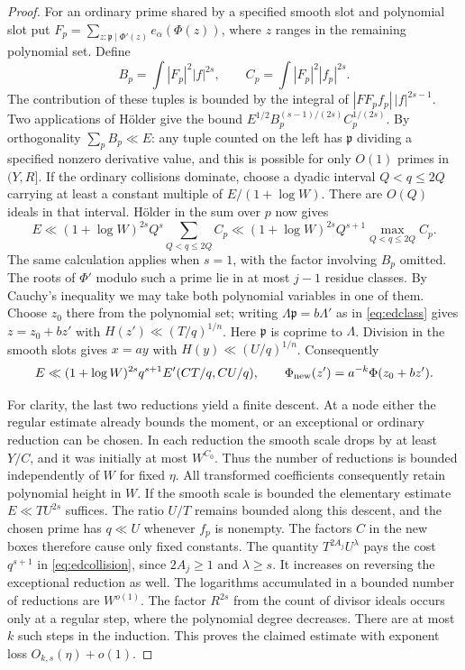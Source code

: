 \documentclass[11pt,letterpaper]{article}
\theoremstyle{definition}
\numberwithin{equation}{section}
\begin{document}
\begin{proof}
For an ordinary prime shared by a specified smooth slot and polynomial
slot put $F_p=\sum_{z:\mathfrak p\mid\Phi'(z)} e_\alpha(\Phi(z))$,
where $z$ ranges in the remaining polynomial set. Define
\[
 B_p=\int |F_p|^2|f|^{2s},\qquad
 C_p=\int |F_p|^2|f_p|^{2s}.
\]
The contribution of these tuples is bounded by the integral of
$|F F_p f_p|\,|f|^{2s-1}$. Two applications of H\"older give the bound
$E^{1/2}B_p^{(s-1)/(2s)}C_p^{1/(2s)}$. By orthogonality
$\sum_p B_p\ll E$: any tuple counted on the left has $\mathfrak p$
dividing a specified nonzero derivative value, and this is possible for
only $O(1)$ primes in $(Y,R]$. If the ordinary collisions dominate,
choose a dyadic interval $Q<q\le2Q$ carrying at least a constant
multiple of $E/(1+\log W)$. There are $O(Q)$ ideals in that interval.
H\"older in the sum over $p$ now gives
\[
 E\ll (1+\log W)^{2s} Q^{s}\sum_{Q<q\le2Q} C_p
 \ll (1+\log W)^{2s} Q^{s+1}\max_{Q<q\le2Q} C_p .
\]
The same calculation applies when $s=1$, with the factor involving
$B_p$ omitted. The roots of $\Phi'$ modulo such a prime lie in at most
$j-1$ residue classes. By Cauchy's inequality we may take both
polynomial variables in one of them. Choose $z_0$ there from the
polynomial set; writing $\Lambda\mathfrak p=b\Lambda'$ as in
\eqref{eq:edclass} gives $z=z_0+bz'$ with
$H(z')\ll (T/q)^{1/n}$. Here $\mathfrak p$ is coprime to $\Lambda$.
Division in the smooth slots gives $x=ay$ with $H(y)\ll (U/q)^{1/n}$.
Consequently
\begin{equation}\label{eq:edcollision}
 E\ll (1+\log W)^{2s}q^{s+1} E'(C T/q,C U/q),\qquad
 \Phi_{\rm new}(z')=a^{-k}\Phi(z_0+bz').
\end{equation}

For clarity, the last two reductions yield a finite descent. At a node
either the regular estimate already bounds the moment, or an exceptional
or ordinary reduction can be chosen. In each reduction the smooth scale
drops by at least $Y/C$, and it was initially at most $W^{C_0}$.
Thus the number of reductions is bounded independently of $W$ for fixed
$\eta$. All transformed coefficients consequently retain polynomial
height in $W$. If the smooth scale is bounded the elementary estimate
$E\ll T U^{2s}$ suffices. The ratio $U/T$ remains bounded along this
descent, and the chosen prime has $q\ll U$ whenever $f_p$ is nonempty.
The factors $C$ in the new boxes therefore cause only fixed constants.
The quantity $T^{2A_j}U^\lambda$ pays the cost $q^{s+1}$ in
\eqref{eq:edcollision}, since $2A_j\ge1$ and $\lambda\ge s$.
It increases on reversing the exceptional reduction as well.
The logarithms accumulated in a bounded number of reductions are
$W^{o(1)}$. The factor $R^{2s}$ from the count of divisor ideals
occurs only at a regular step, where the polynomial degree decreases.
There are at most $k$ such steps in the induction. This proves the
claimed estimate with exponent loss $O_{k,s}(\eta)+o(1)$.
\end{proof}
\end{document}
